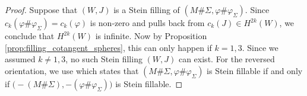 \documentclass[12pt]{amsart}
\newcommand\Z{\mathbb{Z}}
\theoremstyle{remark}
\begin{document}
\begin{proof}
Suppose that $(W, J)$ is a Stein filling of 
$(M\#\Sigma,\varphi\#\varphi_{\Sigma})$.
Since $c_k(\varphi\#\varphi_{\Sigma}) = c_k(\varphi)$ is non{-}zero and pulls back from
$c_k(J) \in H^{2k}(W)$, we conclude that $H^{2k}(W)$ is infinite.
Now by Proposition \ref{prop:filling_cotangent_spheres}, this can only happen if
$k = 1, 3$.  Since we assumed $k \neq 1, 3$, no such Stein filling $(W, J)$ can exist.
For the reversed orientation, we use \cite[Propostion 6.7]{BCS2} which states that
$(M \# \Sigma, \varphi \# \varphi_{\Sigma})$ is Stein fillable if and only if 
$\bigl( -(M \# \Sigma), -(\varphi \# \varphi_{\Sigma}) \bigr)$ is Stein fillable.
\end{proof}
\end{document}
